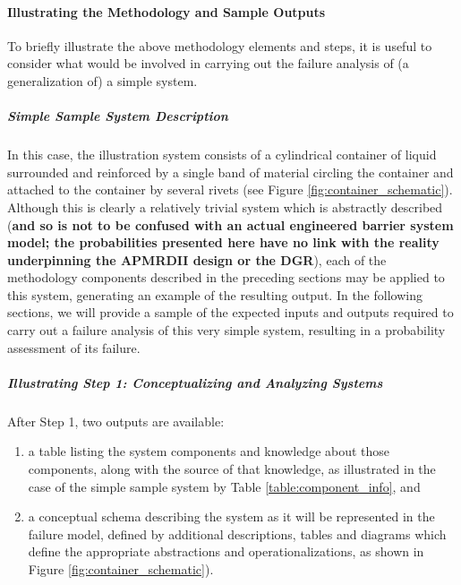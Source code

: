 \paragraph{Illustrating the Methodology and Sample Outputs}
To briefly illustrate the above methodology elements and steps, it is useful to consider what would be involved in carrying out the failure analysis of (a generalization of) a simple system.
\subparagraph{Simple Sample System Description}
\label{sec:samplesystem_description}

In this case, the illustration system consists of a cylindrical container of liquid surrounded and reinforced by a single band of material circling the container and attached to the container by several rivets (see Figure \ref{fig:container_schematic}). \newl Although this is clearly a relatively trivial system which is abstractly described (\textbf{and so is not to be confused with an actual engineered barrier system model; the probabilities presented here have no link with the reality underpinning the APMRDII design or the DGR}), each of the methodology components described in the preceding sections may be applied to this system, generating an example of the resulting output. In the following sections, we will provide a sample of the expected inputs and outputs required to carry out a failure analysis of this very simple system, resulting in a probability assessment of its failure.
\subparagraph{Illustrating Step 1: Conceptualizing and Analyzing Systems}
\label{sec:step1_illustrate}
After Step 1, two outputs are available: 
\begin{enumerate}[noitemsep] 
\item a table listing the system components and knowledge about those components, along with the source of that knowledge, as illustrated in the case of the simple sample system by Table \ref{table:component_info}, and 
\item a conceptual schema describing the system as it will be represented in the failure model, defined by additional descriptions, tables and diagrams which define the appropriate abstractions and operationalizations, as shown in Figure \ref{fig:container_schematic}).
\end{enumerate}

